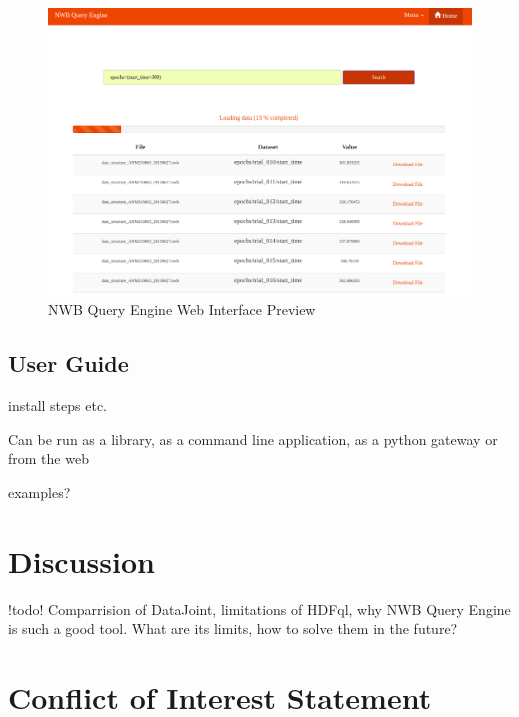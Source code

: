 \documentclass[utf8]{frontiersSCNS} %
\begin{document}
\begin{figure}
  \includegraphics[width=17cm]{nwb-query-engine-web}
\caption{NWB Query Engine Web Interface Preview}
\label{fig:diagram}
\end{figure}

\subsection{User Guide}
install steps etc.

Can be run as a library, as a command line application, as a python gateway or from the web

examples?

\section{Discussion}
\label{Discussion}

!todo! Comparrision of DataJoint, limitations of HDFql, why NWB Query Engine is such a good tool. What are its limits, how to solve them in the future?



\section*{Conflict of Interest Statement}
\end{document}
